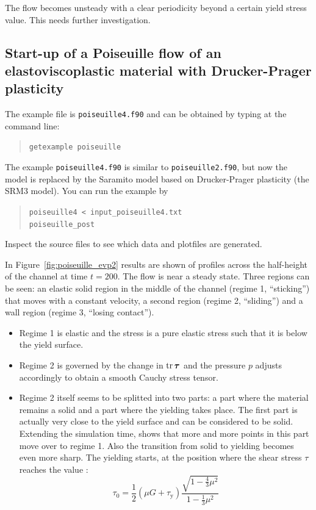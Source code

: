 The flow becomes unsteady with a clear periodicity beyond a certain yield stress value. This needs further investigation.

 \subsection{Start-up of a Poiseuille flow of an elastoviscoplastic material with Drucker-Prager plasticity}
 
The example file is \texttt{poiseuille4.f90} and can be obtained by typing at the command line:
\begin{quote}
   \texttt{getexample poiseuille}
\end{quote}
The example \texttt{poiseuille4.f90} is similar to \texttt{poiseuille2.f90}, but now the model is replaced by the Saramito model based on Drucker-Prager plasticity \cite{saramito_new_2021} (the SRM3 model).
You can run the example by
\begin{quote}
   \texttt{poiseuille4 < input\_poiseuille4.txt}\\
   \texttt{poiseuille\_post}
\end{quote}
Inspect the source files to see which data and plotfiles are generated.

In Figure~\ref{fig:poiseuille_evp2} results are shown of profiles across the half-height of the channel at time $t=200$.
The flow is near a steady state.
Three regions can be seen: an elastic solid region in the middle of the channel (regime 1, ``sticking'') that moves with a constant velocity, a second region (regime 2, ``sliding'') and a wall region (regime 3, ``losing contact'').
\begin{itemize}
\item Regime 1 is elastic and the stress is a pure elastic stress such that it is below the yield surface.
\item Regime 2 is governed by the change in $\operatorname{tr}\boldsymbol{\tau}$ and the pressure $p$ adjusts accordingly to obtain a smooth Cauchy stress tensor.
\item Regime 2 itself seems to be splitted into two parts: a part where the material remains a solid and a part where the yielding takes place. The first part is actually very close to the yield surface and can be considered to be solid. Extending the simulation time, shows that more and more points in this part move over to regime 1. Also the transition from solid to yielding becomes even more sharp. The yielding starts, at the position where the shear stress $\tau$ reaches the value \cite{Hulsennote500}:
\[
   \tau_0 = \frac12(\mu G + \tau_\text{y})\dfrac{\sqrt{1-\frac43\mu^2}}{1-\frac13\mu^2}
\]
\end{itemize}

